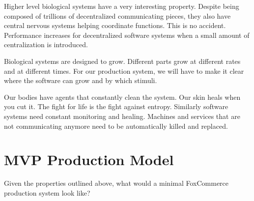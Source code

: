 \documentclass[11pt]{article}
\begin{document}
Higher level biological systems have a very interesting property. Despite being composed
of trillions of decentralized communicating pieces, they also have central nervous
systems helping coordinate functions. This is no accident. Performance increases 
for decentralized software systems when a small amount of centralization is introduced. 

Biological systems are designed to grow. Different parts grow at different 
rates and at different times. For our production system, we will have to make it 
clear where the software can grow and by which stimuli. 

Our bodies have agents that constantly clean the system. Our skin heals when you cut it.
The fight for life is the fight against entropy. Similarly software systems 
need constant monitoring and healing. Machines and services that are not 
communicating anymore need to be automatically killed and replaced.

\section{MVP Production Model}

Given the properties outlined above, what would a minimal FoxCommerce production
system look like?
\end{document}

